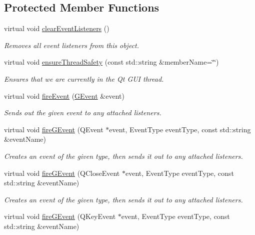 \subsection*{Protected Member Functions}
\begin{DoxyCompactItemize}
\item 
virtual void \mbox{\hyperlink{classGObservable_a80cfa040459ff53594adbd6a51ec8f43}{clear\+Event\+Listeners}} ()
\begin{DoxyCompactList}\small\item\em Removes all event listeners from this object. \end{DoxyCompactList}\item 
virtual void \mbox{\hyperlink{classGObservable_a284f31528c0520f8e545c03ac9eeac74}{ensure\+Thread\+Safety}} (const std\+::string \&member\+Name=\char`\"{}\char`\"{})
\begin{DoxyCompactList}\small\item\em Ensures that we are currently in the Qt G\+UI thread. \end{DoxyCompactList}\item 
virtual void \mbox{\hyperlink{classGObservable_a63e5e5a6227c59c928493b11aceb0f67}{fire\+Event}} (\mbox{\hyperlink{classGEvent}{G\+Event}} \&event)
\begin{DoxyCompactList}\small\item\em Sends out the given event to any attached listeners. \end{DoxyCompactList}\item 
virtual void \mbox{\hyperlink{classGObservable_ab3983ea07337b52020a29cc00c653d8d}{fire\+G\+Event}} (Q\+Event $\ast$event, Event\+Type event\+Type, const std\+::string \&event\+Name)
\begin{DoxyCompactList}\small\item\em Creates an event of the given type, then sends it out to any attached listeners. \end{DoxyCompactList}\item 
virtual void \mbox{\hyperlink{classGObservable_a01fdf1b0e0dbd49e189fe4514e010411}{fire\+G\+Event}} (Q\+Close\+Event $\ast$event, Event\+Type event\+Type, const std\+::string \&event\+Name)
\begin{DoxyCompactList}\small\item\em Creates an event of the given type, then sends it out to any attached listeners. \end{DoxyCompactList}\item 
virtual void \mbox{\hyperlink{classGObservable_abb0b2f66ba39211cb5d7615e9d1c04e2}{fire\+G\+Event}} (Q\+Key\+Event $\ast$event, Event\+Type event\+Type, const std\+::string \&event\+Name)

\end{DoxyCompactItemize}
